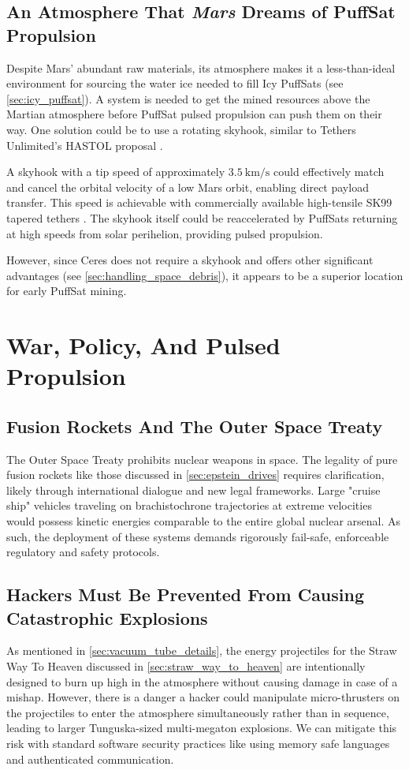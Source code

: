 \documentclass{article}
\begin{document}
\subsection{An Atmosphere That \textit{Mars} Dreams of PuffSat Propulsion}
Despite Mars' abundant raw materials, its atmosphere makes it a less-than-ideal environment for sourcing the water ice needed to fill Icy PuffSats (see \autoref{sec:icy_puffsat}). A system is needed to get the mined resources above the Martian atmosphere before PuffSat pulsed propulsion can push them on their way. One solution could be to use a rotating skyhook, similar to Tethers Unlimited's HASTOL proposal \cite{skyhook_hastol}.

A skyhook with a tip speed of approximately $\SI{3.5}{\kilo\meter\per\second}$ could effectively match and cancel the orbital velocity of a low Mars orbit, enabling direct payload transfer. This speed is achievable with commercially available high-tensile SK99 tapered tethers \cite{sk99_tension}.  The skyhook itself could be reaccelerated by PuffSats returning at high speeds from solar perihelion, providing pulsed propulsion.

However, since Ceres does not require a skyhook and offers other significant advantages (see \autoref{sec:handling_space_debris}), it appears to be a superior location for early PuffSat mining.



\section{War, Policy, And Pulsed Propulsion}
\subsection{Fusion Rockets And The Outer Space Treaty}
The Outer Space Treaty \cite{outer_space_treaty} prohibits nuclear weapons in space. The legality of pure fusion rockets like those discussed in \autoref{sec:epstein_drives} requires clarification, likely through international dialogue and new legal frameworks.  Large "cruise ship" vehicles traveling on brachistochrone trajectories at extreme velocities would possess kinetic energies comparable to the entire global nuclear arsenal. As such, the deployment of these systems demands rigorously fail-safe, enforceable regulatory and safety protocols.

\subsection{Hackers Must Be Prevented From Causing Catastrophic Explosions}
As mentioned in \autoref{sec:vacuum_tube_details}, the energy projectiles for the Straw Way To Heaven discussed in \autoref{sec:straw_way_to_heaven} are intentionally designed to burn up high in the atmosphere without causing damage in case of a mishap.  However, there is a danger a hacker could manipulate micro-thrusters on the projectiles to enter the atmosphere simultaneously rather than in sequence, leading to larger Tunguska-sized \cite{longo2007tunguska}  multi-megaton explosions.  We can mitigate this risk with standard software security practices like using memory safe languages and authenticated communication.
\end{document}
